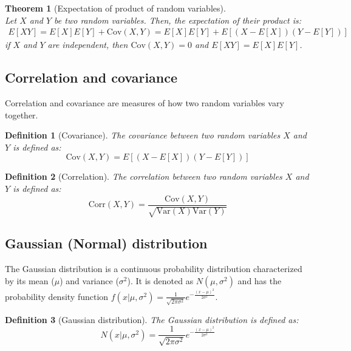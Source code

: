 \documentclass[11pt]{book} %
\newtheorem{theorem}{Theorem}[section]
\newtheorem{definition}{Definition}[section]
\begin{document}
\begin{theorem}[Expectation of product of random variables]\ \\
    Let \(X\) and \(Y\) be two random variables. Then, the expectation of their product is:
    \begin{align*}
        E[XY] = E[X]E[Y] + \text{Cov}(X, Y) = E[X]E[Y] + E[(X - E[X])(Y - E[Y])]
    \end{align*}
    if \(X\) and \(Y\) are independent, then \(\text{Cov}(X, Y) = 0\) and \(E[XY] = E[X]E[Y]\).
\end{theorem}

\subsection{Correlation and covariance}

Correlation and covariance are measures of how two random variables vary together. 
\begin{definition}[Covariance]
    The covariance between two random variables \(X\) and \(Y\) is defined as:
    \begin{equation}
        \text{Cov}(X, Y) = E[(X - E[X])(Y - E[Y])]
    \end{equation}
\end{definition}

\begin{definition}[Correlation]
    The correlation between two random variables \(X\) and \(Y\) is defined as:
    \begin{equation}
        \text{Corr}(X, Y) = \frac{\text{Cov}(X, Y)}{\sqrt{\text{Var}(X) \text{Var}(Y)}}
    \end{equation}
\end{definition}

\subsection{Gaussian (Normal) distribution}

The Gaussian distribution is a continuous probability distribution characterized by its mean (\(\mu\)) and variance (\(\sigma^2\)). 
It is denoted as \(N(\mu, \sigma^2)\) and has the probability density function \(f(x | \mu, \sigma^2) = \frac{1}{\sqrt{2\pi\sigma^2}} e^{-\frac{(x-\mu)^2}{2\sigma^2}}\).

\begin{definition}[Gaussian distribution]
    The Gaussian distribution is defined as:
    \begin{equation}
        N(x | \mu, \sigma^2) = \frac{1}{\sqrt{2\pi\sigma^2}} e^{-\frac{(x-\mu)^2}{2\sigma^2}}
    \end{equation}
\end{definition}
\end{document}
